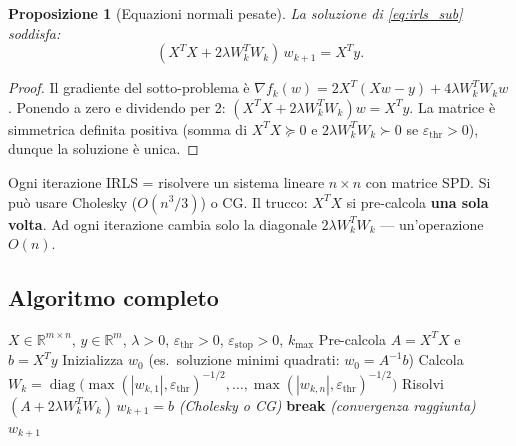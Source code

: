 \documentclass[a4paper,11pt]{article}
\newtheorem{proposition}[theorem]{Proposizione}
\theoremstyle{definition}
\newcommand{\R}{\mathbb{R}}
\newcommand{\norm}[1]{\left\lVert #1 \right\rVert}
\DeclareMathOperator{\diag}{diag}
\begin{document}
\begin{proposition}[Equazioni normali pesate]
La soluzione di \eqref{eq:irls_sub} soddisfa:
\begin{equation}\label{eq:normal_weighted}
  (X^TX + 2\lambda W_k^T W_k)\,w_{k+1} = X^Ty.
\end{equation}
\end{proposition}

\begin{proof}
Il gradiente del sotto-problema è $\nabla f_k(w) = 2X^T(Xw-y) + 4\lambda W_k^TW_kw$. Ponendo a zero e dividendo per 2: $(X^TX + 2\lambda W_k^TW_k)w = X^Ty$. La matrice è simmetrica definita positiva (somma di $X^TX \succeq 0$ e $2\lambda W_k^TW_k \succ 0$ se $\varepsilon_{\text{thr}} > 0$), dunque la soluzione è unica.
\end{proof}

\begin{riassunto}
Ogni iterazione IRLS = risolvere un sistema lineare $n \times n$ con matrice SPD. Si può usare Cholesky ($O(n^3/3)$) o CG. Il trucco: $X^TX$ si pre-calcola \textbf{una sola volta}. Ad ogni iterazione cambia solo la diagonale $2\lambda W_k^TW_k$ --- un'operazione $O(n)$.
\end{riassunto}

\subsection{Algoritmo completo}
\label{subsec:irls_algo}

\begin{algorithm}[H]
\caption{Iteratively Reweighted Least Squares (IRLS) per LASSO}
\label{alg:irls}
\begin{algorithmic}[1]
\Require $X \in \R^{m \times n}$, $y \in \R^m$, $\lambda > 0$, $\varepsilon_{\text{thr}} > 0$, $\varepsilon_{\text{stop}} > 0$, $k_{\max}$
\State Pre-calcola $A = X^TX$ e $b = X^Ty$
\State Inizializza $w_0$ (es.\ soluzione minimi quadrati: $w_0 = A^{-1}b$)
  \State Calcola $W_k = \diag\!\big(\max(|w_{k,1}|, \varepsilon_{\text{thr}})^{-1/2}, \ldots, \max(|w_{k,n}|, \varepsilon_{\text{thr}})^{-1/2}\big)$
  \State Risolvi $(A + 2\lambda W_k^TW_k)\,w_{k+1} = b$ \hfill\emph{(Cholesky o CG)}
  \If{$\norm{w_{k+1} - w_k} / \max(1, \norm{w_k}) < \varepsilon_{\text{stop}}$}
    \State \textbf{break} \hfill\emph{(convergenza raggiunta)}
  \EndIf
\EndFor
\State \Return $w_{k+1}$
\end{algorithmic}
\end{algorithm}
\end{document}
